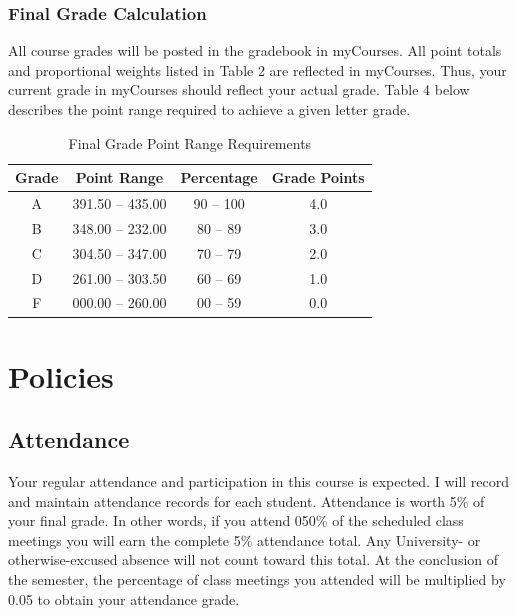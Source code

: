 \documentclass[
]{article}
\begin{document}
\subsubsection{Final Grade Calculation}

All course grades will be posted in the gradebook in myCourses. All
point totals and proportional weights listed in Table 2 are reflected in
myCourses. Thus, your current grade in myCourses should reflect your
actual grade. Table 4 below describes the point range required to
achieve a given letter grade.

\begin{table}[H]
\begin{center}
\caption{Final Grade Point Range Requirements}
\label{finalgrades}
\vspace{3mm}
\begin{tabular}{cccc}
\hline
\bf{Grade} & \bf{Point Range} & \bf{Percentage} & \bf{Grade Points}\\
\hline
A & 391.50 -- 435.00 & 90 -- 100 & 4.0\\ 
B & 348.00 -- 232.00 & 80 -- 89  & 3.0\\ 
C & 304.50 -- 347.00 & 70 -- 79  & 2.0\\ 
D & 261.00 -- 303.50 & 60 -- 69  & 1.0\\ 
F & 000.00 -- 260.00 & 00 -- 59  & 0.0\\
\hline
\end{tabular}
\end{center}
\end{table}

\section{Policies}

\subsection{Attendance}

Your regular attendance and participation in this course is expected. I
will record and maintain attendance records for each student. Attendance
is worth 5\% of your final grade. In other words, if you attend 050\% of
the scheduled class meetings you will earn the complete 5\% attendance
total. Any University- or otherwise-excused absence will not count
toward this total. At the conclusion of the semester, the percentage of
class meetings you attended will be multiplied by 0.05 to obtain your
attendance grade.
\end{document}
